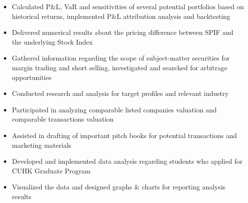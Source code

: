 \documentclass[10pt]{extarticle}
\begin{document}
    \begin{itemize}
        \item Calculated P\&L, VaR and sensitivities of several potential portfolios based on historical returns, implemented P\&L attribution analysis and backtesting
        \item Delivered numerical results about the pricing difference between SPIF and the underlying Stock Index
        \item Gathered information regarding the scope of subject-matter securities for margin trading and short selling, investigated and searched for arbitrage opportunities
    \end{itemize}
    \begin{itemize}
        \item Conducted research and analysis for target profiles and relevant industry
        \item Participated in analyzing comparable listed companies valuation and comparable transactions valuation
        \item Assisted in drafting of important pitch books for potential transactions and marketing materials
    \end{itemize}
    \begin{itemize}
        \item Developed and implemented data analysis regarding students who applied for CUHK Graduate Program
        \item Visualized the data and designed graphs \& charts for reporting analysis results
    \end{itemize}
\end{document}
